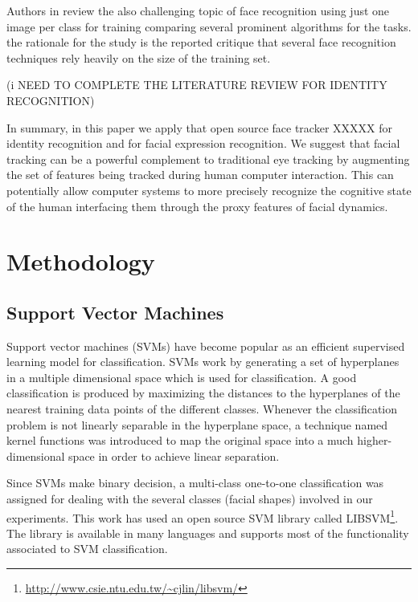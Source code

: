 \documentclass[]{article}
\begin{document}
Authors in \cite{Tan20061725} review the also challenging topic of face recognition using  just one image per
class for training comparing several prominent algorithms for the tasks. the rationale for the study is the reported
critique that several face recognition techniques rely heavily on the size of the training set.

(i NEED TO COMPLETE THE LITERATURE REVIEW FOR IDENTITY RECOGNITION)

In summary, in this paper we apply that open source face tracker XXXXX for identity recognition and for facial
expression recognition. We suggest that facial tracking can be a powerful complement to traditional eye tracking  by
augmenting the set of features being tracked during human computer interaction. This  can potentially allow computer
systems to more precisely recognize the cognitive state of the human interfacing them through the proxy features of facial
dynamics.


\section{Methodology}

\subsection{Support Vector Machines}

Support vector machines (SVMs) have become popular as an efficient supervised learning model for classification. SVMs
work by generating a set of hyperplanes in a multiple dimensional space which is used for classification.  A good
classification is produced by maximizing the distances to the hyperplanes of the nearest training data points of the
different classes. Whenever the classification problem is not linearly separable in the hyperplane space, a technique
named kernel functions was introduced to map the original space into a much higher-dimensional space in order to achieve
linear separation.

Since SVMs make binary decision, a multi-class one-to-one classification was assigned for dealing with the several
classes (facial shapes) involved in our experiments. This work has used an open source SVM library called
LIBSVM\footnote{\url{http://www.csie.ntu.edu.tw/~cjlin/libsvm/}}. The library is available in many languages and
supports most of the functionality associated to SVM classification.
\end{document}
